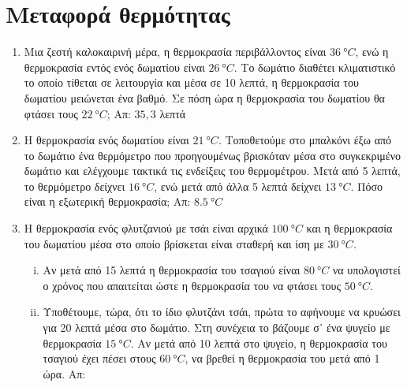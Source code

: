 


\pagestyle{askhseis}
\everymath{\displaystyle}





\begin{center}
\end{center}

\vspace{\baselineskip}

\section*{Μεταφορά θερμότητας}

\begin{enumerate}
  \item Μια ζεστή καλοκαιρινή μέρα, η θερμοκρασία περιβάλλοντος είναι 
    $ \SI{36}{\degree C} $, ενώ η θερμοκρασία εντός ενός δωματίου είναι 
    $ \SI{26}{\degree C} $. Το δωμάτιο διαθέτει κλιματιστικό το οποίο τίθεται 
    σε λειτουργία και μέσα σε 10 λεπτά, η θερμοκρασία του δωματίου μειώνεται ένα βαθμό. 
    Σε πόση ώρα η θερμοκρασία του δωματίου θα φτάσει τους $ \SI{22}{\degree C} $; 
    \hfill Απ: $ 35,3 $ λεπτά 

  \item Η θερμοκρασία ενός δωματίου είναι $ \SI{21}{\degree C} $. Τοποθετούμε στο 
    μπαλκόνι έξω από το δωμάτιο ένα θερμόμετρο που προηγουμένως βρισκόταν μέσα στο 
    συγκεκριμένο δωμάτιο και ελέγχουμε τακτικά τις ενδείξεις του θερμομέτρου. Μετά 
    από 5 λεπτά, το θερμόμετρο δείχνει $ \SI{16}{\degree C} $, ενώ μετά από άλλα 
    5 λεπτά δείχνει $ \SI{13}{\degree C} $. Πόσο είναι η εξωτερική θερμοκρασία;
    \hfill Απ: $ \SI{8,5}{\degree C} $ 

\item Η θερμοκρασία ενός φλυτζανιού με τσάι είναι αρχικά $ \SI{100}{\degree C} $ και 
  η θερμοκρασία του δωματίου μέσα στο οποίο βρίσκεται είναι σταθερή και ίση με 
  $ \SI{30}{\degree C} $. 
  \begin{enumerate}[i)]
    \item Αν μετά από 15 λεπτά η θερμοκρασία του τσαγιού είναι $ \SI{80}{\degree C} $ 
      να υπολογιστεί ο χρόνος που απαιτείται ώστε η θερμοκρασία του να φτάσει τους 
      $ \SI{50}{\degree C} $. 
    \item Υποθέτουμε, τώρα, ότι το ίδιο φλυτζάνι τσάι, πρώτα το αφήνουμε να κρυώσει για 
      20 λεπτά μέσα στο δωμάτιο. Στη συνέχεια το βάζουμε σ᾽ ένα ψυγείο με θερμοκρασία 
      $ \SI{15}{\degree C} $. Αν μετά από 10 λεπτά στο ψυγείο, η θερμοκρασία του 
      τσαγιού έχει πέσει στους $ \SI{60}{\degree C} $, να βρεθεί η θερμοκρασία του μετά 
    από 1 ώρα. 
    \hfill Απ: 
  \end{enumerate}
\end{enumerate}

